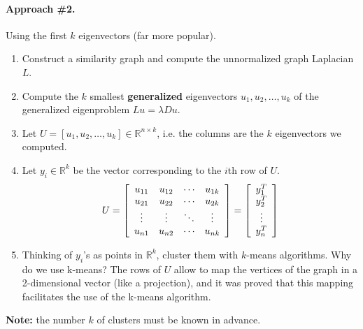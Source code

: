 \paragraph*{Approach \#2.} Using the first $k$ eigenvectors (far more popular).
\begin{enumerate}
	\item Construct a similarity graph and compute the unnormalized graph Laplacian $L$.
	\item Compute the $k$ smallest \textbf{generalized} eigenvectors $u _ { 1 } , u _ { 2 } , \dots , u _ { k }$ of the generalized eigenproblem $L u = \lambda D u$.
	\item Let $U = \left[ u_1, u_{ 2 }, \dots, u_{ k } \right] \in \mathbb { R } ^ { n \times k }$, i.e. the columns are the $k$ eigenvectors we computed.
	\item Let $y_i \in \mathbb{ R }^k$ be the vector corresponding to the $i$th row of $U$.
	$$U = \left[ \begin{array} { c c c c } { u _ { 11 } } & { u _ { 12 } } & { \cdots } & { u _ { 1 k } } \\ { u _ { 21 } } & { u _ { 22 } } & { \cdots } & { u _ { 2 k } } \\ { \vdots } & { \vdots } & { \ddots } & { \vdots } \\ { u _ { n 1 } } & { u _ { n 2 } } & { \cdots } & { u _ { n k } } \end{array} \right] = \left[ \begin{array} { c } { y _ { 1 } ^ { T } } \\ { y _ { 2 } ^ { T } } \\ { \vdots } \\ { y _ { n } ^ { T } } \end{array} \right]$$
	\item Thinking of $y_i$'s as points in $\mathbb{ R }^k$, cluster them with $k$-means algorithms. Why do we use k-means? The rows of $U$ allow to map the vertices of the graph in a 2-dimensional vector (like a projection), and it was proved that this mapping facilitates the use of the k-means algorithm.
\end{enumerate}

\textbf{Note:} the number $k$ of clusters must be known in advance.

